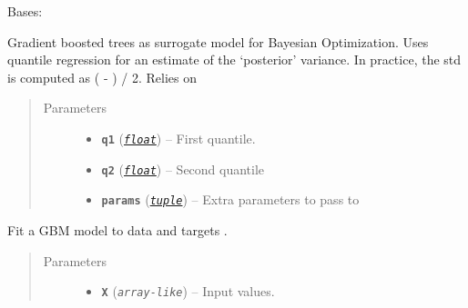 \documentclass[letterpaper,10pt,english]{sphinxmanual}
\begin{document}
\begin{fulllineitems}
\label{pyGPGO.surrogates.BoostedTrees:pyGPGO.surrogates.BoostedTrees.BoostedTrees}
Bases: \href{https://docs.python.org/2/library/functions.html\#object}{}

Gradient boosted trees as surrogate model for Bayesian Optimization.
Uses quantile regression for an estimate of the `posterior' variance.
In practice, the std is computed as ( - ) / 2.
Relies on 
\begin{quote}\begin{description}
\item[{Parameters}] \leavevmode\begin{itemize}
\item {} 
\textbf{\texttt{q1}} (\href{https://docs.python.org/2/library/functions.html\#float}{\emph{\texttt{float}}}) -- First quantile.

\item {} 
\textbf{\texttt{q2}} (\href{https://docs.python.org/2/library/functions.html\#float}{\emph{\texttt{float}}}) -- Second quantile

\item {} 
\textbf{\texttt{params}} (\href{https://docs.python.org/2/library/functions.html\#tuple}{\emph{\texttt{tuple}}}) -- Extra parameters to pass to 

\end{itemize}

\end{description}\end{quote}

\begin{fulllineitems}
\label{pyGPGO.surrogates.BoostedTrees:pyGPGO.surrogates.BoostedTrees.BoostedTrees.fit}
Fit a GBM model to data  and targets .
\begin{quote}\begin{description}
\item[{Parameters}] \leavevmode\begin{itemize}
\item {} 
\textbf{\texttt{X}} (\emph{\texttt{array-like}}) -- Input values.


\end{itemize}
\end{description}
\end{quote}
\end{fulllineitems}
\end{fulllineitems}
\end{document}
